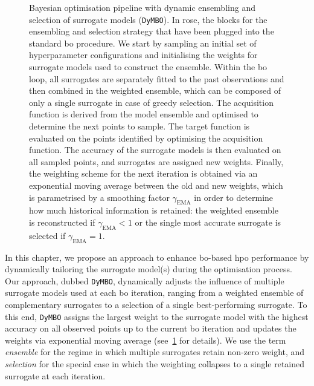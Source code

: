 \begin{figure}[!htbp]
\caption[Bayesian optimisation pipeline with DyMBO]{
    Bayesian optimisation pipeline with dynamic ensembling and selection of surrogate models (\texttt{DyMBO}). In rose, the blocks for the ensembling and selection strategy that have been plugged into the standard \gls{bo} procedure.
    We start by sampling an initial set of hyperparameter configurations and initialising the weights for surrogate models used to construct the ensemble. Within the \gls{bo} loop, all surrogates are separately fitted to the past observations and then combined in the weighted ensemble,
    which can be composed of only a single surrogate in case of greedy selection. The acquisition function is derived from the model ensemble and optimised to determine the next points to sample. The target function is evaluated on the points identified by optimising the acquisition function. The accuracy of the surrogate models is then evaluated on all sampled points, and surrogates are assigned new weights. Finally, the weighting scheme for the next iteration is obtained via an exponential moving average between the old and new weights, which is parametrised by a smoothing factor $\gamma_{\mathrm{EMA}}$ in order to determine how much historical information is retained:
    the weighted ensemble is reconstructed if $\gamma_{\mathrm{EMA}} < 1$ or the single most accurate surrogate is selected if $\gamma_{\mathrm{EMA}} = 1$.
    }
\label{fig:ch06:diagram}
\end{figure}

In this chapter, we propose an approach to enhance \gls{bo}-based \gls{hpo} performance by dynamically tailoring the surrogate model(s) during the optimisation process.
Our approach, dubbed \texttt{DyMBO}, dynamically adjusts the influence of multiple surrogate models used at each \gls{bo} iteration, ranging from a weighted ensemble of complementary surrogates to a selection of a single best-performing surrogate.
To this end, \texttt{DyMBO}
assigns the largest weight to the surrogate model with the highest accuracy
on all observed points up to the current \gls{bo} iteration and updates the
weights via exponential moving average (see~\cref{fig:ch06:diagram} for details).
We use the term
\emph{ensemble} for the regime in which multiple surrogates retain non-zero weight, and \emph{selection} for the special case in which the weighting collapses to a single retained surrogate at each iteration.

